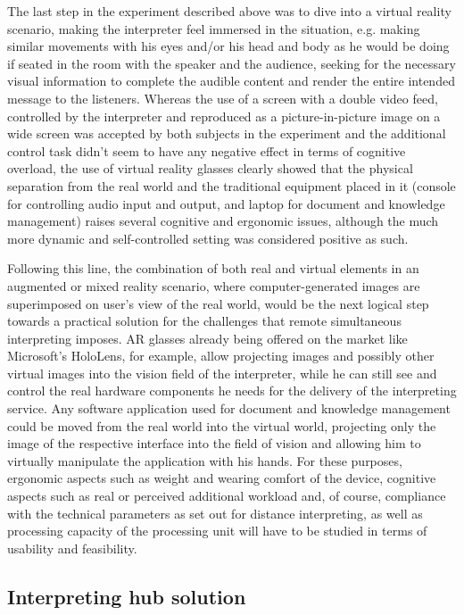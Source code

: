 \documentclass[output=paper]{langsci/langscibook}
\begin{document}
The last step in the experiment described above was to dive into a virtual reality scenario, making the interpreter feel immersed in the situation, e.g. making similar movements with his eyes and/or his head and body as he would be doing if seated in the room with the speaker and the audience, seeking for the necessary visual information to complete the audible content and render the entire intended message to the listeners. Whereas the use of a screen with a double video feed, controlled by the interpreter and reproduced as a picture-in-picture image on a wide screen was accepted by both subjects in the experiment and the additional control task didn’t seem to have any negative effect in terms of cognitive overload, the use of virtual reality glasses clearly showed that the physical separation from the real world and the traditional equipment placed in it (console for controlling audio input and output, and laptop for document and knowledge management) raises several cognitive and ergonomic issues, although the much more dynamic and self-controlled setting was considered positive as such. 

Following this line, the combination of both real and virtual elements in an augmented or mixed reality scenario, where computer-generated images are superimposed on user’s view of the real world, would be the next logical step towards a practical solution for the challenges that remote simultaneous interpreting imposes. AR glasses already being offered on the market like Microsoft’s HoloLens, for example, allow projecting images and possibly other virtual images into the vision field of the interpreter, while he can still see and control the real hardware components he needs for the delivery of the interpreting service. Any software application used for document and knowledge management could be moved from the real world into the virtual world, projecting only the image of the respective interface into the field of vision and allowing him to virtually manipulate the application with his hands. For these purposes, ergonomic aspects such as weight and wearing comfort of the device, cognitive aspects such as real or perceived additional workload and, of course, compliance with the technical parameters as set out for distance interpreting, as well as processing capacity of the processing unit will have to be studied in terms of usability and feasibility.

\subsection{Interpreting hub solution}
\end{document}
